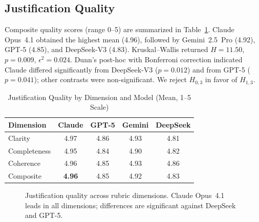 \documentclass[twocolumn,11pt]{article}
\begin{document}
    \subsection{Justification Quality}
    Composite quality scores (range 0--5) are summarized in Table~\ref{tab:quality}. Claude Opus~4.1 obtained the highest mean (4.96), followed by Gemini~2.5~Pro (4.92), GPT-5 (4.85), and DeepSeek-V3 (4.83). Kruskal--Wallis returned $H = 11.50$, $p = 0.009$, $\epsilon^2 = 0.024$. Dunn's post-hoc with Bonferroni correction indicated Claude differed significantly from DeepSeek-V3 ($p = 0.012$) and from GPT-5 ($p = 0.041$); other contrasts were non-significant. We reject $H_{0,3}$ in favor of $H_{1,3}$.
    \begin{table}[!t]
    \caption{Justification Quality by Dimension and Model (Mean, 1--5 Scale)}\label{tab:quality}
    \centering\small
    \begin{tabular}{@{}lcccc@{}}\toprule
    Dimension & Claude & GPT-5 & Gemini & DeepSeek \\\midrule
    Clarity & 4.97 & 4.86 & 4.93 & 4.81 \\
    Completeness & 4.95 & 4.84 & 4.90 & 4.82 \\
    Coherence & 4.96 & 4.85 & 4.93 & 4.86 \\\midrule
    Composite & \textbf{4.96} & 4.85 & 4.92 & 4.83 \\\bottomrule
    \end{tabular}
    \end{table}
    \begin{figure}[!t]
    \centering
    \caption{Justification quality across rubric dimensions. Claude Opus~4.1 leads in all dimensions; differences are significant against DeepSeek and GPT-5.}
    \label{fig:quality}
    \end{figure}
\end{document}

